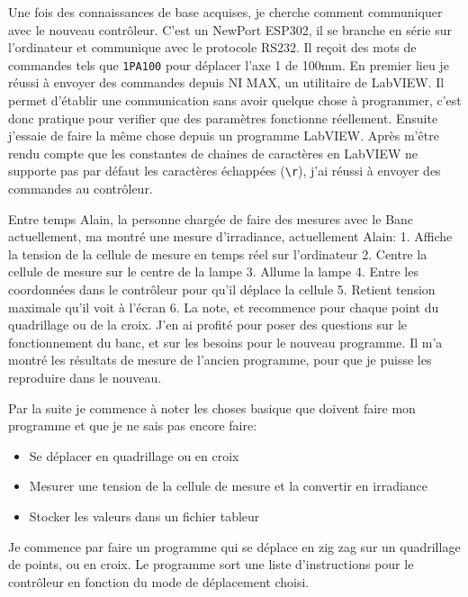\documentclass[a4paper, 12pt]{article}
\begin{document}
  
Une fois des connaissances de base acquises, je cherche comment communiquer avec le nouveau contrôleur.  
C'est un NewPort ESP302, il se branche en série sur l'ordinateur et communique avec le protocole RS232.  
Il reçoit des mots de commandes tels que \verb|1PA100| pour déplacer l'axe 1 de 100mm.  
En premier lieu je réussi à envoyer des commandes depuis NI MAX, un utilitaire de LabVIEW.  
Il permet d'établir une communication sans avoir quelque chose à programmer, c'est donc pratique pour verifier que des paramètres fonctionne réellement.  
Ensuite j'essaie de faire la même chose depuis un programme LabVIEW.  
Après m'être rendu compte que les constantes de chaines de caractères en LabVIEW ne supporte pas par défaut les caractères échappées (\texttt{\textbackslash r}), j'ai réussi à envoyer des commandes au contrôleur.  
  
Entre temps Alain, la personne chargée de faire des mesures avec le Banc actuellement, ma montré une mesure d'irradiance, actuellement Alain:  
1. Affiche la tension de la cellule de mesure en temps réel sur l'ordinateur  
2. Centre la cellule de mesure sur le centre de la lampe  
3. Allume la lampe  
4. Entre les coordonnées dans le contrôleur pour qu'il déplace la cellule  
5. Retient tension maximale qu'il voit à l'écran  
6. La note, et recommence pour chaque point du quadrillage ou de la croix.  
J'en ai profité pour poser des questions sur le fonctionnement du banc, et sur les besoins pour le nouveau programme.  
Il m'a montré les résultats de mesure de l'ancien programme, pour que je puisse les reproduire dans le nouveau.  
  
Par la suite je commence à noter les choses basique que doivent faire mon programme et que je ne sais pas encore faire:  
\begin{itemize}
	\item Se déplacer en quadrillage ou en croix  
\item Mesurer une tension de la cellule de mesure et la convertir en irradiance  
\item Stocker les valeurs dans un fichier tableur  
\end{itemize}
  
Je commence par faire un programme qui se déplace en zig zag sur un quadrillage de points, ou en croix.  
Le programme sort une liste d'instructions pour le contrôleur en fonction du mode de déplacement choisi.  
  
\end{document}
